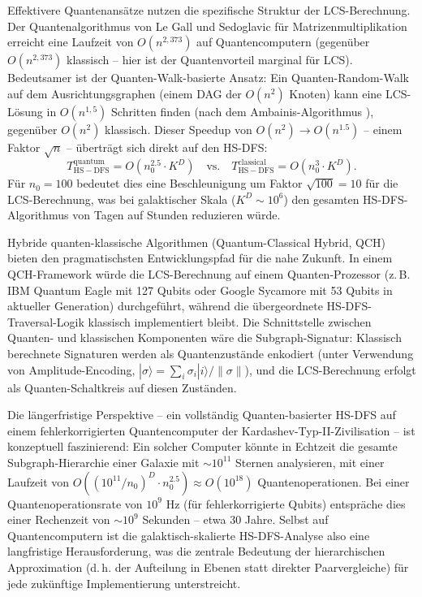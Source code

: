 ﻿\documentclass[a4paper,12pt]{report}
\theoremstyle{definition}
\begin{document}
Effektivere Quantenansätze nutzen die spezifische Struktur der LCS-Berechnung. Der Quantenalgorithmus von Le Gall und Sedoglavic \cite{legall2014} für Matrizenmultiplikation erreicht eine Laufzeit von $O(n^{2{,}373})$ auf Quantencomputern (gegenüber $O(n^{2{,}373})$ klassisch -- hier ist der Quantenvorteil marginal für LCS). Bedeutsamer ist der Quanten-Walk-basierte Ansatz: Ein Quanten-Random-Walk auf dem Ausrichtungsgraphen (einem DAG der $O(n^2)$ Knoten) kann eine LCS-Lösung in $O(n^{1{,}5})$ Schritten finden (nach dem Ambainis-Algorithmus \cite{ambainis2004}), gegenüber $O(n^2)$ klassisch. Dieser Speedup von $O(n^2) \to O(n^{1.5})$ -- einem Faktor $\sqrt{n}$ -- überträgt sich direkt auf den HS-DFS:
\[
T_\mathrm{HS-DFS}^{\mathrm{quantum}} = O\!\left(n_0^{2.5} \cdot K^D\right) \quad \text{vs.} \quad T_\mathrm{HS-DFS}^{\mathrm{classical}} = O\!\left(n_0^3 \cdot K^D\right).
\]
Für $n_0 = 100$ bedeutet dies eine Beschleunigung um Faktor $\sqrt{100} = 10$ für die LCS-Berechnung, was bei galaktischer Skala ($K^D \sim 10^6$) den gesamten HS-DFS-Algorithmus von Tagen auf Stunden reduzieren würde.

Hybride quanten-klassische Algorithmen (Quantum-Classical Hybrid, QCH) bieten den pragmatischsten Entwicklungspfad für die nahe Zukunft. In einem QCH-Framework würde die LCS-Berechnung auf einem Quanten-Prozessor (z.\,B. IBM Quantum Eagle mit 127 Qubits oder Google Sycamore mit 53 Qubits in aktueller Generation) durchgeführt, während die übergeordnete HS-DFS-Traversal-Logik klassisch implementiert bleibt. Die Schnittstelle zwischen Quanten- und klassischen Komponenten wäre die Subgraph-Signatur: Klassisch berechnete Signaturen werden als Quantenzustände enkodiert (unter Verwendung von Amplitude-Encoding, $|\sigma\rangle = \sum_i \sigma_i |i\rangle / \|\sigma\|$), und die LCS-Berechnung erfolgt als Quanten-Schaltkreis auf diesen Zuständen.

Die längerfristige Perspektive -- ein vollständig Quanten-basierter HS-DFS auf einem fehlerkorrigierten Quantencomputer der Kardashev-Typ-II-Zivilisation -- ist konzeptuell faszinierend: Ein solcher Computer könnte in Echtzeit die gesamte Subgraph-Hierarchie einer Galaxie mit $\sim 10^{11}$ Sternen analysieren, mit einer Laufzeit von $O((10^{11}/n_0)^D \cdot n_0^{2.5}) \approx O(10^{18})$ Quantenoperationen. Bei einer Quantenoperationsrate von $10^9$ Hz (für fehlerkorrigierte Qubits) entspräche dies einer Rechenzeit von $\sim 10^9$ Sekunden -- etwa 30 Jahre. Selbst auf Quantencomputern ist die galaktisch-skalierte HS-DFS-Analyse also eine langfristige Herausforderung, was die zentrale Bedeutung der hierarchischen Approximation (d.\,h. der Aufteilung in Ebenen statt direkter Paarvergleiche) für jede zukünftige Implementierung unterstreicht.
\end{document}
